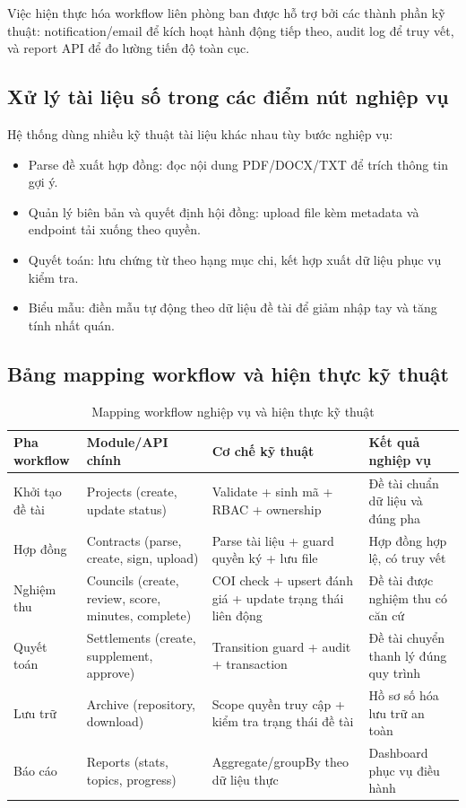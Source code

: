 \documentclass[12pt,a4paper]{report}
\begin{document}
Việc hiện thực hóa workflow liên phòng ban được hỗ trợ bởi các thành phần kỹ thuật: notification/email để kích hoạt hành động tiếp theo, audit log để truy vết, và report API để đo lường tiến độ toàn cục.

\subsection{Xử lý tài liệu số trong các điểm nút nghiệp vụ}
Hệ thống dùng nhiều kỹ thuật tài liệu khác nhau tùy bước nghiệp vụ:
\begin{itemize}[leftmargin=1.2cm]
\item Parse đề xuất hợp đồng: đọc nội dung PDF/DOCX/TXT để trích thông tin gợi ý.
\item Quản lý biên bản và quyết định hội đồng: upload file kèm metadata và endpoint tải xuống theo quyền.
\item Quyết toán: lưu chứng từ theo hạng mục chi, kết hợp xuất dữ liệu phục vụ kiểm tra.
\item Biểu mẫu: điền mẫu tự động theo dữ liệu đề tài để giảm nhập tay và tăng tính nhất quán.
\end{itemize}

\subsection{Bảng mapping workflow và hiện thực kỹ thuật}
\begin{table}[H]
\centering
\small
\begin{tabular}{|L{2.9cm}|L{3.4cm}|L{3.2cm}|L{2.9cm}|}
\hline
\textbf{Pha workflow} & \textbf{Module/API chính} & \textbf{Cơ chế kỹ thuật} & \textbf{Kết quả nghiệp vụ} \\ \hline
Khởi tạo đề tài & Projects (create, update status) & Validate + sinh mã + RBAC + ownership & Đề tài chuẩn dữ liệu và đúng pha \\ \hline
Hợp đồng & Contracts (parse, create, sign, upload) & Parse tài liệu + guard quyền ký + lưu file & Hợp đồng hợp lệ, có truy vết \\ \hline
Nghiệm thu & Councils (create, review, score, minutes, complete) & COI check + upsert đánh giá + update trạng thái liên động & Đề tài được nghiệm thu có căn cứ \\ \hline
Quyết toán & Settlements (create, supplement, approve) & Transition guard + audit + transaction & Đề tài chuyển thanh lý đúng quy trình \\ \hline
Lưu trữ & Archive (repository, download) & Scope quyền truy cập + kiểm tra trạng thái đề tài & Hồ sơ số hóa lưu trữ an toàn \\ \hline
Báo cáo & Reports (stats, topics, progress) & Aggregate/groupBy theo dữ liệu thực & Dashboard phục vụ điều hành \\ \hline
\end{tabular}
\caption{Mapping workflow nghiệp vụ và hiện thực kỹ thuật}
\end{table}
\end{document}
